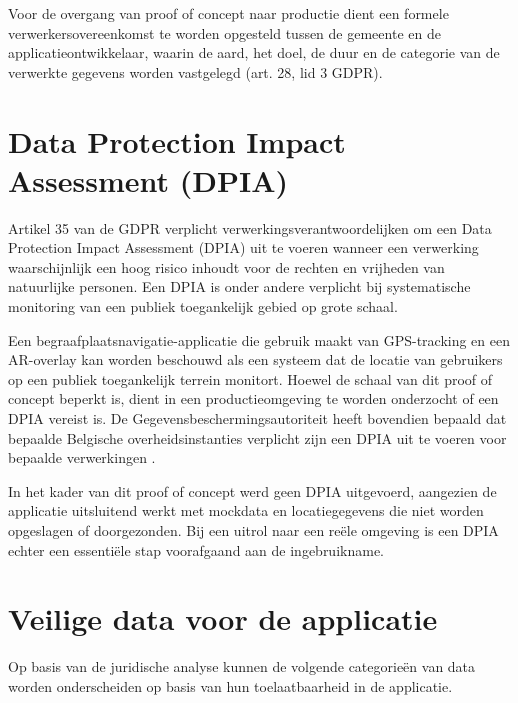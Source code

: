 Voor de overgang van proof of concept naar productie dient een formele verwerkersovereenkomst te worden opgesteld tussen de gemeente en de applicatieontwikkelaar, waarin de aard, het doel, de duur en de categorie van de verwerkte gegevens worden vastgelegd (art. 28, lid 3 GDPR).

\section{Data Protection Impact Assessment (DPIA)}

Artikel 35 van de GDPR verplicht verwerkingsverantwoordelijken om een Data Protection Impact Assessment (DPIA) uit te voeren wanneer een verwerking waarschijnlijk een hoog risico inhoudt voor de rechten en vrijheden van natuurlijke personen. Een DPIA is onder andere verplicht bij systematische monitoring van een publiek toegankelijk gebied op grote schaal.

Een begraafplaatsnavigatie-applicatie die gebruik maakt van GPS-tracking en een AR-overlay kan worden beschouwd als een systeem dat de locatie van gebruikers op een publiek toegankelijk terrein monitort. Hoewel de schaal van dit proof of concept beperkt is, dient in een productieomgeving te worden onderzocht of een DPIA vereist is. De Gegevensbeschermingsautoriteit heeft bovendien bepaald dat bepaalde Belgische overheidsinstanties verplicht zijn een DPIA uit te voeren voor bepaalde verwerkingen \autocite{GBABelgie}.

In het kader van dit proof of concept werd geen DPIA uitgevoerd, aangezien de applicatie uitsluitend werkt met mockdata en locatiegegevens die niet worden opgeslagen of doorgezonden. Bij een uitrol naar een reële omgeving is een DPIA echter een essentiële stap voorafgaand aan de ingebruikname.

\section{Veilige data voor de applicatie}

Op basis van de juridische analyse kunnen de volgende categorieën van data worden onderscheiden op basis van hun toelaatbaarheid in de applicatie.

